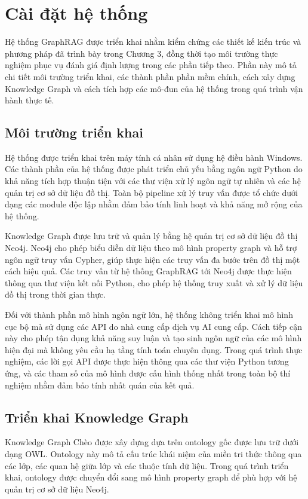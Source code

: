 \section{Cài đặt hệ thống}

Hệ thống GraphRAG được triển khai nhằm kiểm chứng các thiết kế kiến trúc và phương pháp đã trình bày trong Chương 3, đồng thời tạo môi trường thực nghiệm phục vụ đánh giá định lượng trong các phần tiếp theo. Phần này mô tả chi tiết môi trường triển khai, các thành phần phần mềm chính, cách xây dựng Knowledge Graph và cách tích hợp các mô-đun của hệ thống trong quá trình vận hành thực tế.

\subsection{Môi trường triển khai}

Hệ thống được triển khai trên máy tính cá nhân sử dụng hệ điều hành Windows. Các thành phần của hệ thống được phát triển chủ yếu bằng ngôn ngữ Python do khả năng tích hợp thuận tiện với các thư viện xử lý ngôn ngữ tự nhiên và các hệ quản trị cơ sở dữ liệu đồ thị. Toàn bộ pipeline xử lý truy vấn được tổ chức dưới dạng các module độc lập nhằm đảm bảo tính linh hoạt và khả năng mở rộng của hệ thống.

Knowledge Graph được lưu trữ và quản lý bằng hệ quản trị cơ sở dữ liệu đồ thị Neo4j. Neo4j cho phép biểu diễn dữ liệu theo mô hình property graph và hỗ trợ ngôn ngữ truy vấn Cypher, giúp thực hiện các truy vấn đa bước trên đồ thị một cách hiệu quả. Các truy vấn từ hệ thống GraphRAG tới Neo4j được thực hiện thông qua thư viện kết nối Python, cho phép hệ thống truy xuất và xử lý dữ liệu đồ thị trong thời gian thực.

Đối với thành phần mô hình ngôn ngữ lớn, hệ thống không triển khai mô hình cục bộ mà sử dụng các API do nhà cung cấp dịch vụ AI cung cấp. Cách tiếp cận này cho phép tận dụng khả năng suy luận và tạo sinh ngôn ngữ của các mô hình hiện đại mà không yêu cầu hạ tầng tính toán chuyên dụng. Trong quá trình thực nghiệm, các lời gọi API được thực hiện thông qua các thư viện Python tương ứng, và các tham số của mô hình được cấu hình thống nhất trong toàn bộ thí nghiệm nhằm đảm bảo tính nhất quán của kết quả.

\subsection{Triển khai Knowledge Graph}

Knowledge Graph Chèo được xây dựng dựa trên ontology gốc được lưu trữ dưới dạng OWL. Ontology này mô tả cấu trúc khái niệm của miền tri thức thông qua các lớp, các quan hệ giữa lớp và các thuộc tính dữ liệu. Trong quá trình triển khai, ontology được chuyển đổi sang mô hình property graph để phù hợp với hệ quản trị cơ sở dữ liệu Neo4j.


